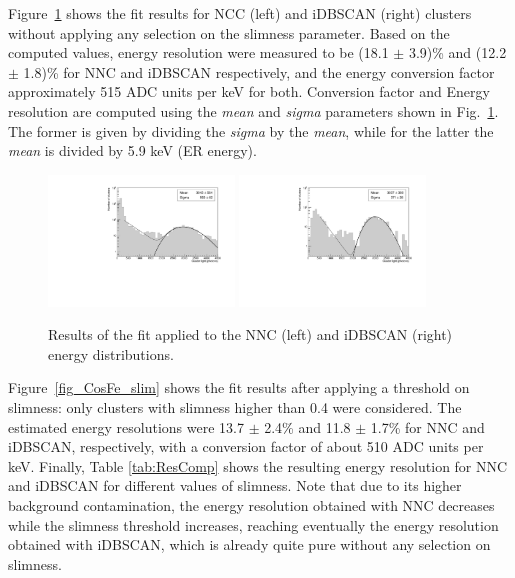 \documentclass[a4paper,11pt]{article}
\begin{document}
Figure~\ref{fig_CosFe} shows the fit results for NCC (left) and iDBSCAN (right) clusters without applying any selection on the slimness parameter.
Based on the computed values, energy resolution were measured to be (18.1 $\pm$ 3.9)\% and (12.2 $\pm$ 1.8)\% for NNC and iDBSCAN respectively, and the energy conversion factor approximately 515 ADC units per keV for both.
Conversion factor and Energy resolution are computed using the \textit{mean} and \textit{sigma} parameters shown in Fig.~\ref{fig_CosFe}. 
The former is given by dividing the \textit{sigma} by the \textit{mean}, while for the latter the \textit{mean} is divided by 5.9 keV (ER energy).
%

\begin{figure}[ht]
\centering
\includegraphics[width=0.44\textwidth]{log_Resolution_NNC_0.pdf}
\includegraphics[width=0.44\textwidth]{log_Resolution_DB_0.pdf}
\caption{Results of the fit applied to the NNC (left) and iDBSCAN (right) energy distributions.}
\label{fig_CosFe}
\end{figure}


%



Figure~\ref{fig_CosFe_slim} shows the fit results after applying a threshold on slimness: only clusters with slimness higher than 0.4 were considered.
The estimated energy resolutions were 13.7 $\pm$ 2.4\% and 11.8 $\pm$ 1.7\% for NNC and iDBSCAN, respectively, with a conversion factor of about 510 ADC units per keV.
Finally, Table \ref{tab:ResComp} shows the resulting energy resolution for NNC and iDBSCAN for different values of slimness. Note that due to its higher background contamination, the energy resolution obtained with NNC decreases while the slimness threshold increases, reaching eventually the energy resolution obtained with iDBSCAN, which is already quite pure without any selection on slimness.
\end{document}
